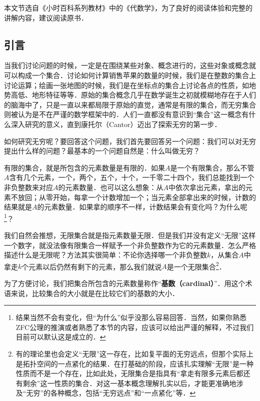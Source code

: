 



本文节选自《小时百科系列教材》中的《代数学》，为了良好的阅读体验和完整的讲解内容，建议阅读原书．

\subsection{引言}

当我们讨论问题的时候，一定是在围绕某些对象、概念进行的，这些对象或概念就可以构成一个集合．讨论如何计算销售苹果的数量的时候，我们是在整数的集合上讨论运算；绘画一张地图的时候，我们是在坐标点的集合上讨论各点的性质，如地势高低、地形特征等等．原始的集合概念几乎在数学诞生之初就模糊地存在于人们的脑海中了，只是一直以来都局限于原始的直觉，通常是有限的集合，而无穷集合则被认为是不在严谨的数学框架中的．人们一直都没有意识到“集合”这一概念有什么深入研究的意义，直到康托尔（Cantor）迈出了探索无穷的第一步．

如何研究无穷呢？要回答这个问题，我们首先要回答另一个问题：我们可以对无穷提出什么样的问题？最基本的一个问题自然是：什么叫做无穷？

有限的集合，就是所包含的元素数量是有限的．如果$A$是一个有限集合，那么不管$A$含有几个元素，一个，两个，五个，十个，一千零二十四个，我们总能找到一个非负整数来对应$A$的元素数量．也可以这么想象：从$A$中依次拿出元素，拿出的元素不放回；从零开始，每拿一个计数增加一个；当元素全部拿出来的时候，计数的结果就是$A$的元素数量．如果拿的顺序不一样，计数结果会有变化吗？为什么呢\footnote{结果当然不会有变化，但“为什么”似乎没那么容易回答．当然，如果你熟悉ZFC公理的推演或者熟悉了本节的内容，应该可以给出严谨的解释，不过我们目前可以默认这是成立的．}？

我们自然会推想，无限集合就是指元素数量无限．但是我们并没有定义“无限”这样一个数字，就没法像有限集合一样赋予一个非负整数作为它的元素数量．怎么严格描述什么是无限呢？方法其实很简单：不论你选择哪一个非负整数$k$，从集合$A$中拿走$k$个元素以后仍然有剩下的元素，那么我们就说$A$是一个无限集合\footnote{有的理论里也会定义“无限”这一存在，比如复平面的无穷远点，但那个实际上是拓扑空间的一点紧化的结果．在打基础的阶段，应该扎实理解“无限”是一种性质而不是一个存在，比如此处，无限集合是指具有“拿走有限多元素后都还有剩余”这一性质的集合．对这一基本概念理解扎实以后，才能更准确地涉及“无穷”的各种概念，包括“无穷远点”和“一点紧化”等．}．

为了方便讨论，我们把集合所包含的元素数量称作“\textbf{基数（cardinal）}”．用这个术语来说，比较集合的大小就是在比较它们的基数的大小．

